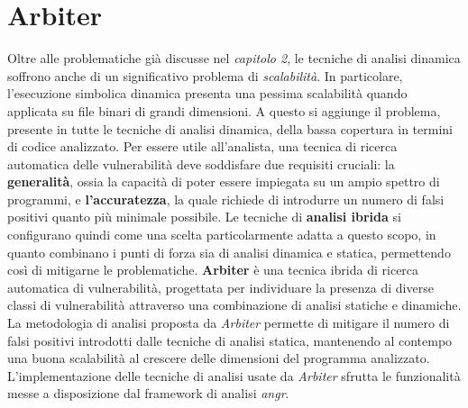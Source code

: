 \documentclass[../main.tex]{subfiles}
\begin{document}
\section{Arbiter}
Oltre alle problematiche già discusse nel \textit{capitolo 2}, le tecniche di analisi dinamica soffrono anche di un significativo problema di \textit{scalabilità}. 
In particolare, l'esecuzione simbolica dinamica presenta una pessima scalabilità quando applicata su file binari di grandi dimensioni. 
A questo si aggiunge il problema, presente in tutte le tecniche di analisi dinamica, della bassa copertura in termini di codice analizzato.
Per essere utile all'analista, una tecnica di ricerca automatica delle vulnerabilità deve soddisfare due requisiti cruciali: la \textbf{generalità}, ossia la capacità di poter essere impiegata
su un ampio spettro di programmi, e \textbf{l'accuratezza}, la quale richiede di introdurre un numero di falsi positivi quanto più minimale possibile.
Le tecniche di \textbf{analisi ibrida} si configurano quindi come una scelta particolarmente adatta a questo scopo, in quanto combinano i punti di forza sia di analisi dinamica e statica, permettendo così di mitigarne
le problematiche. \textbf{Arbiter} \cite{Arbier} è una tecnica ibrida di ricerca automatica di vulnerabilità, progettata per individuare la presenza di diverse classi di vulnerabilità attraverso una combinazione di analisi statiche e dinamiche.
La metodologia di analisi proposta da \textit{Arbiter} permette di mitigare il numero di falsi positivi introdotti dalle tecniche di analisi statica, mantenendo al contempo una buona scalabilità al crescere delle dimensioni del programma analizzato.
L'implementazione delle tecniche di analisi usate da \textit{Arbiter} sfrutta le funzionalità messe a disposizione dal framework di analisi \textit{angr}.
\newpage
\end{document}
